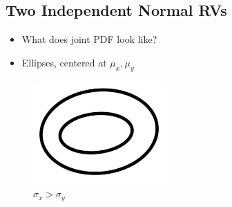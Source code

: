 \documentclass{article}
\begin{document}
\subsection{Two Independent Normal RVs}


\begin{itemize}
    \item What does joint PDF look like?
    \item Ellipses, centered at $\mu_x, \mu_y$
\end{itemize}

\begin{figure}[h]
\centering
\begin{minipage}{.45\linewidth}
  \includegraphics[width=\linewidth]{images/L11/wider.jpeg}
  \caption{$\sigma_x > \sigma_y$}
  \label{wider}
\end{minipage}
\hspace{.05\linewidth}
\begin{minipage}{.45\linewidth}

\end{minipage}
\end{figure}
\end{document}
